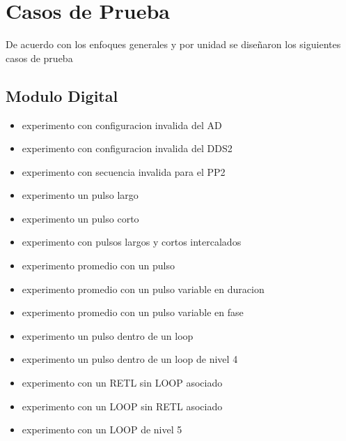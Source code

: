 \section{Casos de Prueba}

De acuerdo con los enfoques generales y por unidad se diseñaron los siguientes casos de prueba

\subsection{Modulo Digital}
\begin{itemize}
\item experimento con configuracion invalida del AD
\item experimento con configuracion invalida del DDS2
\item experimento con secuencia invalida para el PP2
\item experimento un pulso largo
\item experimento un pulso corto
\item experimento con pulsos largos y cortos intercalados
\item experimento promedio con un pulso
\item experimento promedio con un pulso variable en duracion
\item experimento promedio con un pulso variable en fase
\item experimento un pulso dentro de un loop
\item experimento un pulso dentro de un loop de nivel 4
\item experimento con un RETL sin LOOP asociado
\item experimento con un LOOP sin RETL asociado
\item experimento con un LOOP de nivel 5
\end{itemize}

